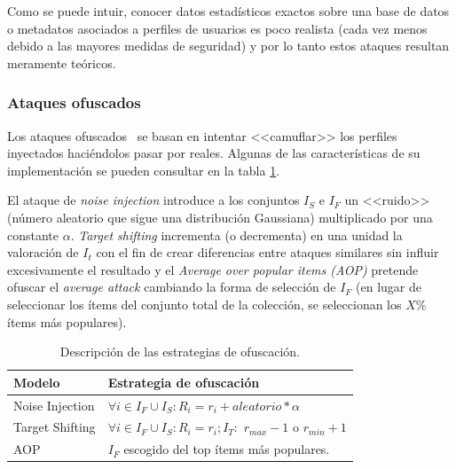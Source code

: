 Como se puede intuir, conocer datos estadísticos exactos sobre una base de datos o metadatos asociados a perfiles de usuarios es poco realista (cada vez menos debido a las mayores medidas de seguridad) y por lo tanto estos ataques resultan meramente teóricos.

\subsubsection{Ataques ofuscados}

Los ataques ofuscados~\cite{mingdan2018ShillingAttacksAReview} se basan en intentar <<camuflar>> los perfiles inyectados haciéndolos pasar por reales. Algunas de las características de su implementación se pueden consultar en la tabla \ref{tabla_descripcion_estrategias_ofuscación}.

El ataque de \textit{noise injection} introduce a los conjuntos $I_S$ e $I_F$ un <<ruido>> (número aleatorio que sigue una distribución Gaussiana) multiplicado por una constante $\alpha$. \textit{Target shifting} incrementa (o decrementa) en una unidad la valoración de $I_t$ con el fin de crear diferencias entre ataques similares sin influir excesivamente el resultado y el \textit{Average over popular items (AOP)} pretende ofuscar el \textit{average attack} cambiando la forma de selección de $I_F$ (en lugar de seleccionar los ítems del conjunto total de la colección, se seleccionan los $X\%$ ítems más populares).

\begin{table}
\small
\begin{centering}
	
		\begin{tabular}{@{}p{10em} p{20em}@{}}
		\toprule
		\textbf{Modelo} & \textbf{Estrategia de ofuscación}\\ 
		\midrule
			
		Noise Injection & $\forall i \in I_F \cup I_S: R_i = r_i + aleatorio * \alpha$\\
		Target Shifting & $\forall i \in I_F \cup I_S: R_i = r_i; I_T:$ $r_{max}-1$ o $r_{min}+1$\\
		AOP & $I_F$ escogido del top ítems más populares.\\
			
		\bottomrule
		\end{tabular}

\end{centering}
\caption{Descripción de las estrategias de ofuscación.}	\label{tabla_descripcion_estrategias_ofuscación}
\end{table}


